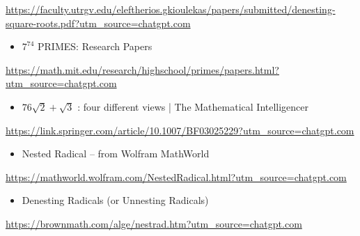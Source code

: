 \documentclass[10pt]{article}
\begin{document}
\href{https://faculty.utrgv.edu/eleftherios.gkioulekas/papers/submitted/denesting-square-roots.pdf?utm_source=chatgpt.com}{https://faculty.utrgv.edu/eleftherios.gkioulekas/papers/submitted/denesting-square-roots.pdf?utm\_source=chatgpt.com}

\begin{itemize}
  \item[] $7^{74}$ PRIMES: Research Papers
\end{itemize}

\href{https://math.mit.edu/research/highschool/primes/papers.html?utm_source=chatgpt.com}{https://math.mit.edu/research/highschool/primes/papers.html?utm\_source=chatgpt.com}

\begin{itemize}
  \item[] $76 \sqrt{2}+\sqrt{3}$ : four different views | The Mathematical Intelligencer
\end{itemize}

\href{https://link.springer.com/article/10.1007/BF03025229?utm_source=chatgpt.com}{https://link.springer.com/article/10.1007/BF03025229?utm\_source=chatgpt.com}

\begin{itemize}
  \item[77] Nested Radical -- from Wolfram MathWorld
\end{itemize}

\href{https://mathworld.wolfram.com/NestedRadical.html?utm_source=chatgpt.com}{https://mathworld.wolfram.com/NestedRadical.html?utm\_source=chatgpt.com}

\begin{itemize}
  \item[78] Denesting Radicals (or Unnesting Radicals)
\end{itemize}

\href{https://brownmath.com/alge/nestrad.htm?utm_source=chatgpt.com}{https://brownmath.com/alge/nestrad.htm?utm\_source=chatgpt.com}
\end{document}

